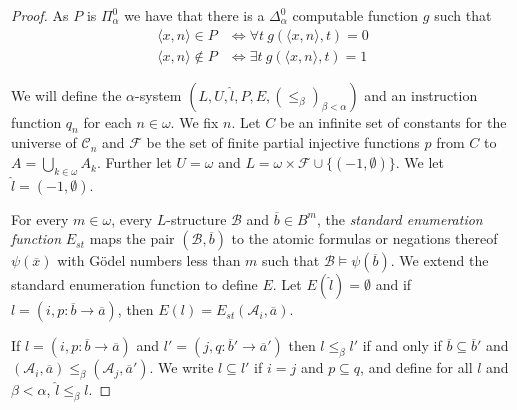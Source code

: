 \documentclass[10pt,a4paper]{amsart}
\newcommand\+[1]{\mathcal{#1}}
\renewcommand\*[1]{\mathbf{#1}}
\renewcommand\=[1]{\text{#1}}
\renewcommand\*[1]{\mathbf{#1}}
\newcommand{\ol}[1]{\overline{#1}}
\newcommand{\mc}[1]{\mathcal{#1}}
\newcommand{\ra}{\rightarrow}
\begin{document}
\begin{proof}
As $P$ is $\Pi_{\alpha}^0$ we have that there is a $\Delta_{\alpha}^0$ computable function $g$ such that
\begin{align*}
    \langle x,n\rangle \in P &\iff \forall t\ g(\langle x,n\rangle, t)=0\\
    \langle x,n\rangle \not \in P &\iff \exists t\ g(\langle x,n\rangle, t)=1
\end{align*}

We will define the $\alpha$-system $(L,U,\hat l, P,E,(\leq_\beta)_{\beta<\alpha})$ and an instruction function $q_n$ for each $n\in \omega$. We fix $n$. Let $C$ be an infinite set of constants for the universe of $\mc C_n$ and $\mc F$ be the set of finite partial injective functions $p$ from $C$ to $A=\bigcup_{k\in \omega} A_k$. Further let $U=\omega$ and $L=\omega\times \mc F \cup \{(-1,\emptyset)\}$. We let $\hat l=(-1,\emptyset)$.

For every $m\in \omega$, every $L$-structure $\mc B$ and $\ol b\in B^{m}$, the \emph{standard enumeration function} $E_{st}$ maps the pair $(\mc B,\ol b)$ to the atomic formulas or negations thereof $\psi(\ol x)$ with G\"odel numbers less than $m$ such that $\mc B\models \psi(\ol b)$. We extend the standard enumeration function to define $E$. Let $E(\hat l)=\emptyset$ and if $l=(i,p:\ol b\ra \ol a)$, then $E(l)=E_{st}(\mc A_i, \ol a)$.

If $l=(i,p:\ol b \ra \ol a)$ and $l'=(j,q:\ol b'\ra \ol a')$ then $l\leq_\beta l'$ if and only if $\ol b\subseteq \ol b'$ and $(\mc A_i,\ol a)\leq_\beta (\mc A_j,\ol a')$. We write $l\subseteq l'$ if $i=j$ and $p\subseteq q$, and define for all $l$ and $\beta<\alpha$, $\hat l\leq_\beta l$.


\end{proof}
\end{document}
